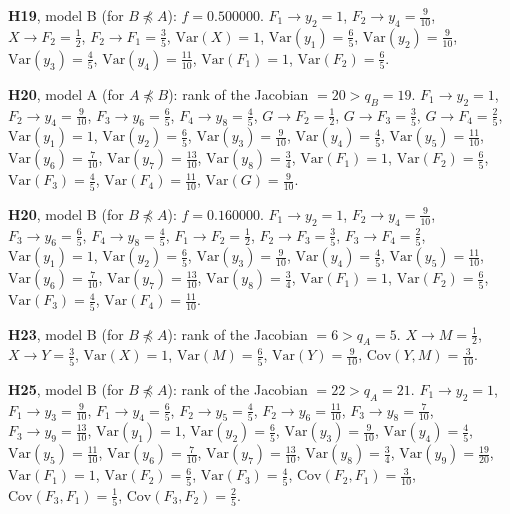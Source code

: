 \documentclass[10pt,a4paper]{article}
\newcommand{\nnest}{\not\preceq}
\begin{document}
{\noindent\textbf{H19}, model B (for $B\nnest A$): $f=0.500000$. {\footnotesize $F_{1}\to y_{2}=1$, $F_{2}\to y_{4}=\tfrac{9}{10}$, $X\to F_{2}=\tfrac{1}{2}$, $F_{2}\to F_{1}=\tfrac{3}{5}$, $\mathrm{Var}(X)=1$, $\mathrm{Var}(y_{1})=\tfrac{6}{5}$, $\mathrm{Var}(y_{2})=\tfrac{9}{10}$, $\mathrm{Var}(y_{3})=\tfrac{4}{5}$, $\mathrm{Var}(y_{4})=\tfrac{11}{10}$, $\mathrm{Var}(F_{1})=1$, $\mathrm{Var}(F_{2})=\tfrac{6}{5}$.}\par\smallskip
\noindent\textbf{H20}, model A (for $A\nnest B$): rank of the Jacobian $=20>q_B=19$. {\footnotesize $F_{1}\to y_{2}=1$, $F_{2}\to y_{4}=\tfrac{9}{10}$, $F_{3}\to y_{6}=\tfrac{6}{5}$, $F_{4}\to y_{8}=\tfrac{4}{5}$, $G\to F_{2}=\tfrac{1}{2}$, $G\to F_{3}=\tfrac{3}{5}$, $G\to F_{4}=\tfrac{2}{5}$, $\mathrm{Var}(y_{1})=1$, $\mathrm{Var}(y_{2})=\tfrac{6}{5}$, $\mathrm{Var}(y_{3})=\tfrac{9}{10}$, $\mathrm{Var}(y_{4})=\tfrac{4}{5}$, $\mathrm{Var}(y_{5})=\tfrac{11}{10}$, $\mathrm{Var}(y_{6})=\tfrac{7}{10}$, $\mathrm{Var}(y_{7})=\tfrac{13}{10}$, $\mathrm{Var}(y_{8})=\tfrac{3}{4}$, $\mathrm{Var}(F_{1})=1$, $\mathrm{Var}(F_{2})=\tfrac{6}{5}$, $\mathrm{Var}(F_{3})=\tfrac{4}{5}$, $\mathrm{Var}(F_{4})=\tfrac{11}{10}$, $\mathrm{Var}(G)=\tfrac{9}{10}$.}\par\smallskip
\noindent\textbf{H20}, model B (for $B\nnest A$): $f=0.160000$. {\footnotesize $F_{1}\to y_{2}=1$, $F_{2}\to y_{4}=\tfrac{9}{10}$, $F_{3}\to y_{6}=\tfrac{6}{5}$, $F_{4}\to y_{8}=\tfrac{4}{5}$, $F_{1}\to F_{2}=\tfrac{1}{2}$, $F_{2}\to F_{3}=\tfrac{3}{5}$, $F_{3}\to F_{4}=\tfrac{2}{5}$, $\mathrm{Var}(y_{1})=1$, $\mathrm{Var}(y_{2})=\tfrac{6}{5}$, $\mathrm{Var}(y_{3})=\tfrac{9}{10}$, $\mathrm{Var}(y_{4})=\tfrac{4}{5}$, $\mathrm{Var}(y_{5})=\tfrac{11}{10}$, $\mathrm{Var}(y_{6})=\tfrac{7}{10}$, $\mathrm{Var}(y_{7})=\tfrac{13}{10}$, $\mathrm{Var}(y_{8})=\tfrac{3}{4}$, $\mathrm{Var}(F_{1})=1$, $\mathrm{Var}(F_{2})=\tfrac{6}{5}$, $\mathrm{Var}(F_{3})=\tfrac{4}{5}$, $\mathrm{Var}(F_{4})=\tfrac{11}{10}$.}\par\smallskip
\noindent\textbf{H23}, model B (for $B\nnest A$): rank of the Jacobian $=6>q_A=5$. {\footnotesize $X\to M=\tfrac{1}{2}$, $X\to Y=\tfrac{3}{5}$, $\mathrm{Var}(X)=1$, $\mathrm{Var}(M)=\tfrac{6}{5}$, $\mathrm{Var}(Y)=\tfrac{9}{10}$, $\mathrm{Cov}(Y,M)=\tfrac{3}{10}$.}\par\smallskip
\noindent\textbf{H25}, model B (for $B\nnest A$): rank of the Jacobian $=22>q_A=21$. {\footnotesize $F_{1}\to y_{2}=1$, $F_{1}\to y_{3}=\tfrac{9}{10}$, $F_{1}\to y_{4}=\tfrac{6}{5}$, $F_{2}\to y_{5}=\tfrac{4}{5}$, $F_{2}\to y_{6}=\tfrac{11}{10}$, $F_{3}\to y_{8}=\tfrac{7}{10}$, $F_{3}\to y_{9}=\tfrac{13}{10}$, $\mathrm{Var}(y_{1})=1$, $\mathrm{Var}(y_{2})=\tfrac{6}{5}$, $\mathrm{Var}(y_{3})=\tfrac{9}{10}$, $\mathrm{Var}(y_{4})=\tfrac{4}{5}$, $\mathrm{Var}(y_{5})=\tfrac{11}{10}$, $\mathrm{Var}(y_{6})=\tfrac{7}{10}$, $\mathrm{Var}(y_{7})=\tfrac{13}{10}$, $\mathrm{Var}(y_{8})=\tfrac{3}{4}$, $\mathrm{Var}(y_{9})=\tfrac{19}{20}$, $\mathrm{Var}(F_{1})=1$, $\mathrm{Var}(F_{2})=\tfrac{6}{5}$, $\mathrm{Var}(F_{3})=\tfrac{4}{5}$, $\mathrm{Cov}(F_{2},F_{1})=\tfrac{3}{10}$, $\mathrm{Cov}(F_{3},F_{1})=\tfrac{1}{5}$, $\mathrm{Cov}(F_{3},F_{2})=\tfrac{2}{5}$.}\par\smallskip
}
\end{document}
